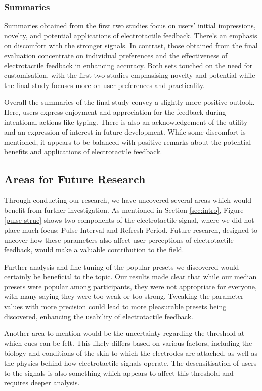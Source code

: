 \documentclass{mpaper}
\begin{document}
\subsubsection{Summaries}
Summaries obtained from the first two studies focus on users' initial impressions, novelty, and potential applications of electrotactile feedback. There's an emphasis on discomfort with the stronger signals. In contrast, those obtained from the final evaluation concentrate on individual preferences and the effectiveness of electrotactile feedback in enhancing accuracy. Both sets touched on the need for customisation, with the first two studies emphasising novelty and potential while the final study focuses more on user preferences and practicality.

Overall the summaries of the final study convey a slightly more positive outlook. Here, users express enjoyment and appreciation for the feedback during intentional actions like typing. There is also an acknowledgement of the utility and an expression of interest in future development. While some discomfort is mentioned, it appears to be balanced with positive remarks about the potential benefits and applications of electrotactile feedback.

\subsection{Areas for Future Research}
Through conducting our research, we have uncovered several areas which would benefit from further investigation. As mentioned in Section \ref{sec:intro}, Figure \ref{pulse-struc} shows two components of the electrotactile signal, where we did not place much focus: Pulse-Interval and Refresh Period. Future research, designed to uncover how these parameters also affect user perceptions of electrotactile feedback, would make a valuable contribution to the field.

Further analysis and fine-tuning of the popular presets we discovered would certainly be beneficial to the topic. Our results made clear that while our median presets were popular among participants, they were not appropriate for everyone, with many saying they were too weak or too strong. Tweaking the parameter values with more precision could lead to more pleasurable presets being discovered, enhancing the usability of electrotactile feedback.

Another area to mention would be the uncertainty regarding the threshold at which cues can be felt. This likely differs based on various factors, including the biology and conditions of the skin to which the electrodes are attached, as well as the physics behind how electrotactile signals operate. The desensitisation of users to the signals is also something which appears to affect this threshold and requires deeper analysis.
\end{document}
